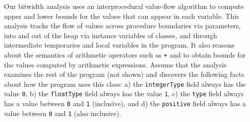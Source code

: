 \documentclass{sig-alt-full}
\begin{document}
Our bitwidth analysis uses an interprocedural
value-flow algorithm to compute upper and lower bounds for the
values that can appear in each variable. This analysis tracks
the flow of values across procedure boundaries via parameters,
into and out of the heap via instance variables of classes, and through
intermediate temporaries and local variables in the program.
It also reasons about the semantics of arithmetic operators such
as {\tt +} and {\tt *} to obtain bounds for the values computed
by arithmetic expressions. 
Assume that the analysis examines the rest of the program (not shown)
and discovers the following facts about 
how the program uses this class: a) the {\tt integerType} 
field always has the value {\tt 0}, b) the {\tt floatType} 
field always has the value {\tt 1}, c) the {\tt type} 
field always has a value between {\tt 0} and {\tt 1} (inclusive),
and d) the {\tt positive} field always has a value between 
{\tt 0} and {\tt 1} (also inclusive).
\end{document}
